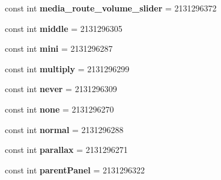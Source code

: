 \begin{DoxyCompactItemize}
\item 
\hypertarget{classClient_1_1Droid_1_1Resource_1_1Id_a1b6f84b6ba0d55cf91e9ddff5a9a1cd0}{}const int {\bfseries media\+\_\+route\+\_\+volume\+\_\+slider} = 2131296372\label{classClient_1_1Droid_1_1Resource_1_1Id_a1b6f84b6ba0d55cf91e9ddff5a9a1cd0}

\item 
\hypertarget{classClient_1_1Droid_1_1Resource_1_1Id_a9382a17cea38bc2e1113bda26fa0c43d}{}const int {\bfseries middle} = 2131296305\label{classClient_1_1Droid_1_1Resource_1_1Id_a9382a17cea38bc2e1113bda26fa0c43d}

\item 
\hypertarget{classClient_1_1Droid_1_1Resource_1_1Id_a8886c6f18bcfe8025140328fb502e15f}{}const int {\bfseries mini} = 2131296287\label{classClient_1_1Droid_1_1Resource_1_1Id_a8886c6f18bcfe8025140328fb502e15f}

\item 
\hypertarget{classClient_1_1Droid_1_1Resource_1_1Id_ada81dd2a7d81035a409adb67855f2ded}{}const int {\bfseries multiply} = 2131296299\label{classClient_1_1Droid_1_1Resource_1_1Id_ada81dd2a7d81035a409adb67855f2ded}

\item 
\hypertarget{classClient_1_1Droid_1_1Resource_1_1Id_a35a8252dc11bb30b5cd4f7ba6a26f235}{}const int {\bfseries never} = 2131296309\label{classClient_1_1Droid_1_1Resource_1_1Id_a35a8252dc11bb30b5cd4f7ba6a26f235}

\item 
\hypertarget{classClient_1_1Droid_1_1Resource_1_1Id_aa8bc952f2a772445f2891cd3d27a0bff}{}const int {\bfseries none} = 2131296270\label{classClient_1_1Droid_1_1Resource_1_1Id_aa8bc952f2a772445f2891cd3d27a0bff}

\item 
\hypertarget{classClient_1_1Droid_1_1Resource_1_1Id_afe8692c9d9c2942177211878e4135e4c}{}const int {\bfseries normal} = 2131296288\label{classClient_1_1Droid_1_1Resource_1_1Id_afe8692c9d9c2942177211878e4135e4c}

\item 
\hypertarget{classClient_1_1Droid_1_1Resource_1_1Id_a085d89a908a651065309fb431b148385}{}const int {\bfseries parallax} = 2131296271\label{classClient_1_1Droid_1_1Resource_1_1Id_a085d89a908a651065309fb431b148385}

\item 
\hypertarget{classClient_1_1Droid_1_1Resource_1_1Id_a8a205480bde3cc947b3feae67ea5c1de}{}const int {\bfseries parent\+Panel} = 2131296322\label{classClient_1_1Droid_1_1Resource_1_1Id_a8a205480bde3cc947b3feae67ea5c1de}


\end{DoxyCompactItemize}
